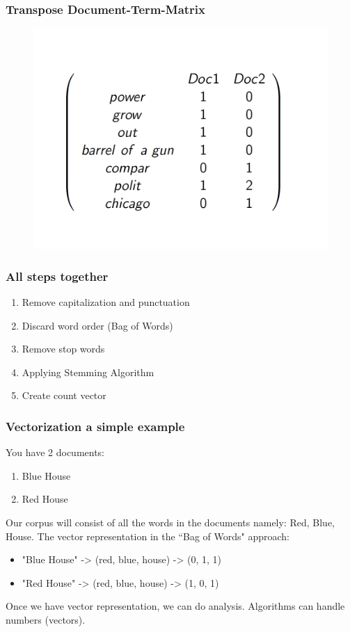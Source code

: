 \documentclass[compress, aspectratio=54]{beamer}
\begin{document}
\begin{frame}
\frametitle{Transpose Document-Term-Matrix}
\begin{figure}

\includegraphics[width=0.5\linewidth ]{Figures/document_term_matrix.png}
\end{figure}

\end{frame}




\begin{frame}
\frametitle{All steps together}

\begin{enumerate}
\item Remove capitalization and punctuation
\item Discard word order (Bag of Words)
\item Remove stop words
\item Applying Stemming Algorithm
\item Create count vector 
\end{enumerate}
\end{frame}




\begin{frame}
\frametitle{Vectorization a simple example}
You have 2 documents:
\begin{enumerate}
\item  Blue House
\item Red House
\end{enumerate}
 Our corpus will consist of all the words in the documents namely: Red, Blue, House. The vector representation in the  ``Bag of Words" approach: 

\begin{itemize}

\item "Blue House" -> (red, blue, house) -> (0, 1, 1)
\item "Red House" -> (red, blue, house) -> (1, 0, 1)
\end{itemize}

Once we have vector representation, we can do analysis. Algorithms can handle numbers (vectors).
\end{frame}
\end{document}
